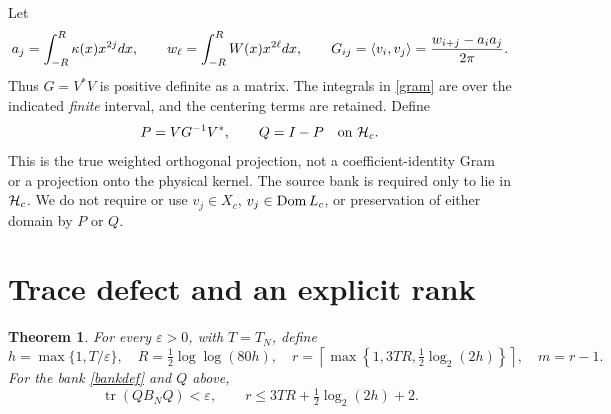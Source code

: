 \documentclass[11pt]{article}
\newtheorem{theorem}{Theorem}[section]\newtheorem{lemma}[theorem]{Lemma}\newtheorem{corollary}[theorem]{Corollary}
\begin{document}
Let
\begin{equation}\label{gram}
 a_j=\int_{-R}^{R}\kappa(x)x^{2j}dx,\qquad w_\ell=\int_{-R}^{R}W(x)x^{2\ell}dx,\qquad
 G_{ij}=\langle v_i,v_j\rangle=\frac{w_{i+j}-a_i a_j}{2\pi}.
\end{equation}
Thus $G=V^*V$ is positive definite as a matrix. The integrals in \eqref{gram} are over the indicated \emph{finite} interval, and the centering terms are retained. Define
\[P=VG^{-1}V^*,\qquad Q=I-P\quad\text{on }\mathcal H_c.\]
This is the true weighted orthogonal projection, not a coefficient-identity Gram or a projection onto the physical kernel. The source bank is required only to lie in $\mathcal H_c$. We do not require or use $v_j\in X_c$, $v_j\in\operatorname{Dom} L_c$, or preservation of either domain by $P$ or $Q$.

\section{Trace defect and an explicit rank}\label{compression}
\begin{theorem}\label{defect}
For every $\varepsilon>0$, with $T=T_N$, define
\begin{equation}\label{parameters}
 h=\max\{1,T/\varepsilon\},\quad R=\tfrac12\log\log(80h),\quad
 r=\left\lceil\max\left\{1,3TR,\tfrac12\log_2(2h)\right\}\right\rceil,\quad m=r-1.
\end{equation}
For the bank \eqref{bankdef} and $Q$ above,
\begin{equation}\label{traceerror}
 \operatorname{tr}(QB_NQ)<\varepsilon,\qquad
 r\le3TR+\tfrac12\log_2(2h)+2.
\end{equation}
\end{theorem}
\end{document}
